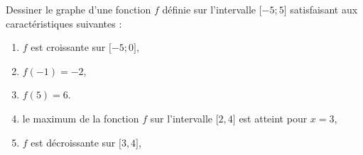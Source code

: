 
\begin{exercice}\label{exosmath-0505}

    Dessiner le graphe d'une fonction \( f\) définie sur l'intervalle \( \mathopen[ -5 ;5 \mathclose]\)  satisfaisant aux caractéristiques suivantes :
    \begin{enumerate}
        \item
            \( f\) est croissante sur \( \mathopen[ -5; 0 \mathclose]\),
        \item
            \( f(-1)=-2\),
        \item
            \( f(5)=6\).
        \item
            le maximum de la fonction \( f\) sur l'intervalle $\mathopen[ 2 , 4 \mathclose]$ est atteint pour \( x=3\),
        \item
            \( f\) est décroissante sur \( \mathopen[ 3 , 4 \mathclose]\),
    \end{enumerate}
    

\end{exercice}
